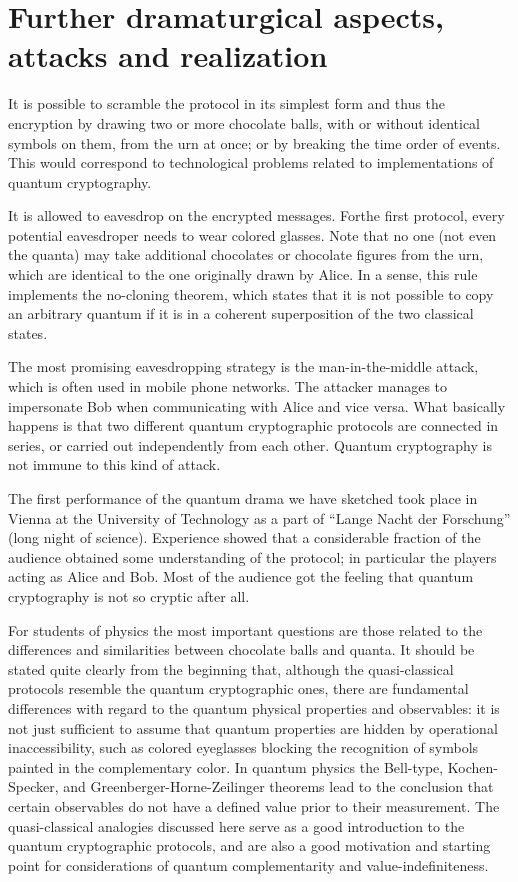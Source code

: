 \documentclass[prb,amssymb,preprint]{revtex4}
\begin{document}
\section{Further dramaturgical aspects, attacks and realization}

It is possible to scramble the protocol in its simplest form and thus the
encryption by drawing two or more chocolate balls, with or without identical
symbols on them, from the urn at once; or by breaking the time order of
events.
This would correspond to technological problems related to
implementations of quantum cryptography.

It is allowed to eavesdrop on the encrypted
messages. Forthe first protocol, every potential eavesdroper needs
to wear colored glasses. Note that no one (not even
the quanta) may take additional chocolates or chocolate figures from the
urn, which are identical to the one originally drawn by Alice.
In a sense, this rule implements the no-cloning theorem, which states that
it is not possible to copy an arbitrary quantum if it is in a coherent
superposition of the two classical states.

The most promising eavesdropping strategy is the man-in-the-middle
attack, which is often used in mobile phone networks.
The attacker manages to impersonate Bob when communicating with Alice and
vice versa. What basically happens is that two different quantum
cryptographic protocols are connected in series, or carried out
independently from each other. Quantum cryptography is not immune to this
kind of attack.

The first performance of the quantum drama we have sketched took place
in Vienna at the University of Technology as a part of
``Lange Nacht der Forschung'' (long night of science). Experience showed
that a considerable fraction of the audience obtained some understanding of
the protocol; in particular the players acting as Alice and Bob. Most
of the audience got the feeling that quantum cryptography is not so
cryptic after all.

For students of physics the most important questions
are those related to the differences and similarities between chocolate balls
and quanta.
It should be stated quite clearly from the beginning that,
although the quasi-classical protocols resemble the quantum cryptographic
ones, there are fundamental differences
with regard to the quantum physical properties and observables:
it is not just sufficient to assume that quantum properties are hidden
by operational inaccessibility, such as colored eyeglasses
blocking the recognition of symbols painted in the complementary color.
In quantum physics the Bell-type, Kochen-Specker,
and Greenberger-Horne-Zeilinger theorems\cite{mermin-93}
lead to the conclusion that certain observables do not
have a defined value prior to their measurement.
The quasi-classical analogies discussed here serve
as a good introduction to the quantum cryptographic protocols,
and are also a good motivation and starting point
for considerations of quantum complementarity and value-indefiniteness.
\end{document}
